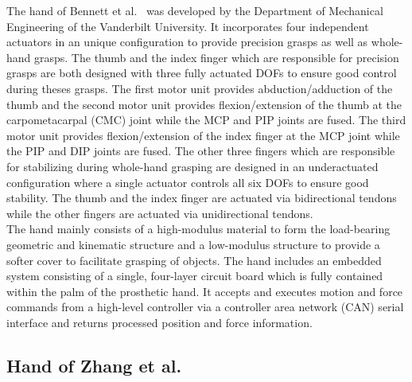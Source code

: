 \documentclass[a4paper, 10pt, conference]{ieeeconf}      %
\begin{document}
The hand of Bennett et al.~\cite{bennett} was developed by the Department of Mechanical Engineering of the Vanderbilt University. It incorporates four independent actuators in an unique configuration to provide precision grasps as well as whole-hand grasps. The thumb and the index finger which are responsible for precision grasps are both designed with three fully actuated DOFs to ensure good control during theses grasps. The first motor unit provides abduction/adduction of the thumb and the second motor unit provides flexion/extension of the thumb at the carpometacarpal (CMC) joint while the MCP and PIP joints are fused. The third motor unit provides flexion/extension of the index finger at the MCP joint while the PIP and DIP joints are fused. The other three fingers which are responsible for stabilizing during whole-hand grasping are designed in an underactuated configuration where a single actuator controls all six DOFs to ensure good stability. The thumb and the index finger are actuated via bidirectional tendons while the other fingers are actuated via unidirectional tendons.\\
The hand mainly consists of a high-modulus material to form the load-bearing geometric and kinematic structure and a low-modulus structure to provide a softer cover to facilitate grasping of objects. The hand includes an embedded system consisting of a single, four-layer circuit board which is fully contained within the palm of the prosthetic hand. It accepts and executes motion and force commands from a high-level controller via a controller area network (CAN) serial interface and returns processed position and force information.

\subsection{Hand of Zhang et al.}
\end{document}
